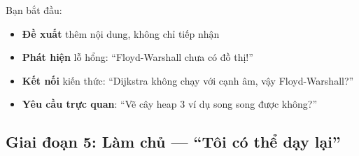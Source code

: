 \documentclass[11pt]{article}
\begin{document}
\begin{insightbox}
Bạn bắt đầu:
\begin{itemize}[leftmargin=1.2em, itemsep=2pt]
  \item \textbf{Đề xuất} thêm nội dung, không chỉ tiếp nhận
  \item \textbf{Phát hiện} lỗ hổng: ``Floyd-Warshall chưa có đồ thị!''
  \item \textbf{Kết nối} kiến thức: ``Dijkstra không chạy với cạnh âm, vậy Floyd-Warshall?''
  \item \textbf{Yêu cầu trực quan}: ``Vẽ cây heap 3 ví dụ song song được không?''
\end{itemize}
\end{insightbox}

\subsection{Giai đoạn 5: Làm chủ — ``Tôi có thể dạy lại''}
\end{document}
